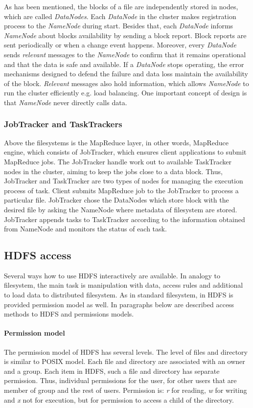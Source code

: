 \documentclass[a4paper,12pt,oneside]{report}
\begin{document}
As has been mentioned, the blocks of a file are independently stored in nodes, which are called
\textit{DataNodes}. Each \textit{DataNode} in the cluster makes registration process to the \textit{NameNode} during start. 
Besides that, each \textit{DataNode} informs \textit{NameNode} about blocks availability by sending a block report. 
Block reports are sent periodically or when a change event happens. Moreover, every \textit{DataNode} sends 
\emph{relevant} messages to the \textit{NameNode} to confirm that
it remains operational and that the data is safe and available. If a \textit{DataNode} stops operating, the error 
mechanisms designed to defend the failure and data loss maintain the availability of the block.
\emph{Relevant} messages also hold information, which allows \textit{NameNode} to run the cluster efficiently e.g. 
load balancing. One important concept of design  is that \textit{NameNode} never directly calls data.
		

\subsubsection{JobTracker and TaskTrackers}
Above the filesystems is  the MapReduce layer, in other words, MapReduce engine, which consists of 
JobTracker,  which ensures client applications to submit MapReduce jobs. The JobTracker handle work 
out to available TaskTracker nodes in the cluster, 
aiming to keep the jobs close to a data block.  Thus, JobTracker and TaskTracker are two types of 
nodes for managing the execution process of  task.
Client submits MapReduce job  to the JobTracker to process a particular file. JobTracker chose the 
DataNodes which store block with the desired file by asking the NameNode where  metadata of filesystem are stored. 
JobTracker appends tasks to TaskTracker according to the  information obtained from NameNode and monitors the status of each task.


\subsection{HDFS access} 
	Several ways how to use HDFS interactively are available. In analogy to filesystem, the main task is manipulation with data, access rules and additional to load data to distributed filesystem. As in standard filesystem, in HDFS is provided permission model as well. In paragraphs below are described access methods to HDFS and permissions models.

\paragraph{Permission model}
The permission model of HDFS has several levels. The level of files and directory is similar to POSIX model. Each file and directory are associated with an owner and a group. Each item in HDFS, such a file and directory has separate permission. Thus, individual permissions for the user, for other users that are member of group and the rest of users. Permission is: \textit{r} for reading, \textit{w} for writing and \textit{x} not for execution, but for permission to access a child of the directory.\cite{permission}
\end{document}

